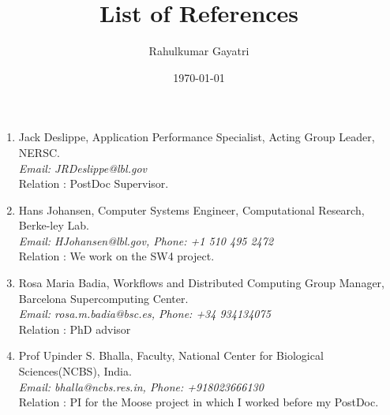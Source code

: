 \documentclass[a4paper]{article}
\title{List of References}
\author{Rahulkumar Gayatri}
\date{\today}
\begin{document}
\fontsize{12}{15}
\selectfont
\maketitle

\begin{enumerate}
    \item Jack Deslippe, Application Performance Specialist, Acting Group Leader, NERSC.\\
        {\it Email: JRDeslippe@lbl.gov}\\
        Relation : PostDoc Supervisor.
    \item Hans Johansen, Computer Systems Engineer, Computational Research, Berke-ley Lab. \\
        {\it Email: HJohansen@lbl.gov, Phone: +1 510 495 2472 }\\
        Relation : We work on the SW4 project.
    \item Rosa Maria Badia, Workflows and Distributed Computing Group Manager, Barcelona Supercomputing Center. \\
        {\it Email: rosa.m.badia@bsc.es, Phone: +34 934134075} \\
        Relation : PhD advisor
    \item Prof Upinder S. Bhalla, Faculty, National Center for Biological Sciences(NCBS), India.\\
        {\it Email: bhalla@ncbs.res.in, Phone: +918023666130}\\
        Relation : PI for the Moose project in which I worked before my PostDoc.

\end{enumerate}
\end{document}
